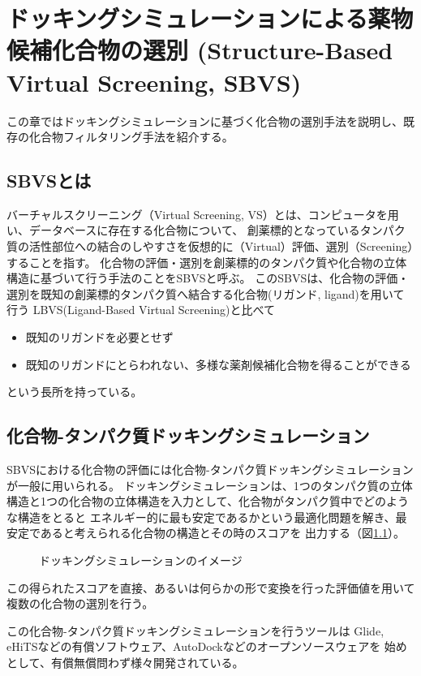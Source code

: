 \chapter{ドッキングシミュレーションによる薬物候補化合物の選別 (Structure-Based Virtual Screening, SBVS)}
この章ではドッキングシミュレーションに基づく化合物の選別手法を説明し、既存の化合物フィルタリング手法を紹介する。

\section{SBVSとは}
バーチャルスクリーニング（Virtual Screening, VS）とは、コンピュータを用い、データベースに存在する化合物について、
創薬標的となっているタンパク質の活性部位への結合のしやすさを仮想的に（Virtual）評価、選別（Screening）することを指す。
化合物の評価・選別を創薬標的のタンパク質や化合物の立体構造に基づいて行う手法のことをSBVSと呼ぶ。
このSBVSは、化合物の評価・選別を既知の創薬標的タンパク質へ結合する化合物(リガンド, ligand)を用いて行う
LBVS(Ligand-Based Virtual Screening)と比べて
\begin{itemize}
\item 既知のリガンドを必要とせず
\item 既知のリガンドにとらわれない、多様な薬剤候補化合物を得ることができる
\end{itemize}
という長所を持っている。

\section{化合物-タンパク質ドッキングシミュレーション}
SBVSにおける化合物の評価には化合物-タンパク質ドッキングシミュレーションが一般に用いられる。
ドッキングシミュレーションは、1つのタンパク質の立体構造と1つの化合物の立体構造を入力として、化合物がタンパク質中でどのような構造をとると
エネルギー的に最も安定であるかという最適化問題を解き、最安定であると考えられる化合物の構造とその時のスコアを
出力する（図\ref{fig:docking}）。
\begin{figure}[tb]
 \begin{center}
  \caption{ドッキングシミュレーションのイメージ}
  \label{fig:docking}
 \end{center}
\end{figure}
この得られたスコアを直接、あるいは何らかの形で変換を行った評価値を用いて複数の化合物の選別を行う。

この化合物-タンパク質ドッキングシミュレーションを行うツールは
Glide\cite{Friesner2004}, eHiTS\cite{Zsoldos2007}などの有償ソフトウェア、AutoDock\cite{Morris2009}などのオープンソースウェアを
始めとして、有償無償問わず様々開発されている。

